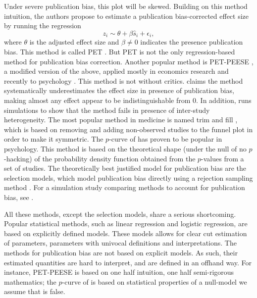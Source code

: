 Under severe publication bias, this plot will be skewed. Building on this method intuition, the authors propose to estimate a publication bias-corrected effect size by running the regression
\[
z_{i}\sim\theta+\beta\widehat{s}_{i}+\epsilon_{i},
\]
where $\theta$ is the adjusted effect size and $\beta\neq0$ indicates the presence publication bias. This method is called PET \parencite{stanley_beyond_2005}. But PET is not the only regression-based method for publication bias
correction. Another popular method is PET-PEESE \parencite{Stanley2014-gx}, a modified version of the above, applied mostly in economics research and recently to psychology \parencite{carter_series_2015}. This method is not without critics. \cite{gervais_putting_2015} claims the method systematically underestimates the effect size in presence of publication bias, making almost any effect appear to be indistinguishable from $0$. In addition, \cite{simonsohn_[59]_2017} runs simulations to show that the method fails in presence of inter-study heterogeneity. The most popular method in medicine is named trim and fill \parencite{Duval2000-ct}, which is based on removing and adding non-observed studies to the funnel plot in order to make it symmetric. The $p$-curve of \cite{simonsohn_p-curve:_2014} has proven to be popular in psychology. This method is based on the theoretical shape (under the null of no $p$-hacking) of the probability density function obtained from the $p$-values from a set of studies.
The theoretically best justified model for publication bias are the selection models, which model publication bias directly using a rejection sampling method \cite{Hedges1992-ue}. For a simulation study comparing methods to account for publication bias, see \cite{moreno_assessment_2009,Carter2019-rw}.

All these methods, except the selection models, share a serious shortcoming. Popular statistical methods, such as linear regression and logistic regression, are based on explicitly defined models. These models allows for clear cut estimation of parameters, parameters with univocal definitions and interpretations. The methods for publication bias are not based on explicit models. As such, their estimated quantities are hard to interpret, and are defined in an offhand way. For instance, PET-PEESE is based on one half intuition, one half semi-rigorous mathematics; the $p$-curve of is based on statistical properties of a null-model we assume that is false. 

